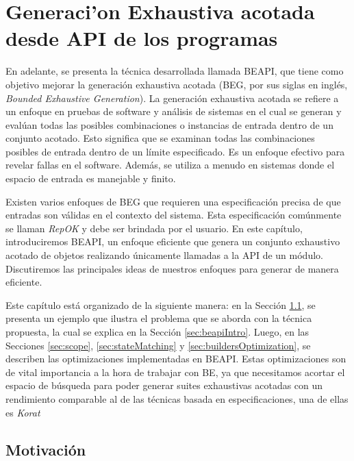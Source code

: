 \chapter{Generaci'on Exhaustiva acotada desde API de los programas}
\label{cap:beapi}

En adelante, se presenta la técnica desarrollada llamada BEAPI, que tiene como objetivo mejorar la generación exhaustiva acotada (BEG, por sus siglas en inglés, \emph{Bounded Exhaustive Generation}). 
La generación exhaustiva acotada se refiere a un enfoque en pruebas de software
y análisis de sistemas en el cual se generan y evalúan todas las posibles combinaciones o instancias de entrada dentro de un conjunto acotado. 
Esto significa que se examinan todas las combinaciones posibles de entrada dentro de un límite especificado. 
Es un enfoque efectivo para revelar fallas en el software. Además, se utiliza a menudo en sistemas donde el espacio de entrada es manejable y finito. 

Existen varios enfoques de BEG que requieren una especificación precisa de que entradas son válidas en el contexto del sistema. 
Esta especificación comúnmente se llaman \emph{RepOK} y debe ser brindada por el usuario.
En este capítulo, introduciremos BEAPI, un enfoque eficiente que genera un conjunto exhaustivo acotado de objetos realizando únicamente llamadas a la API de un módulo. 
Discutiremos las principales ideas de nuestros enfoques para generar de manera eficiente. 

Este capítulo está organizado de la siguiente manera: en la Sección \ref{sec:motivating-example}, 
se presenta un ejemplo que ilustra el problema que se aborda con la técnica propuesta, 
la cual se explica en la Sección \ref{sec:beapiIntro}. Luego, en las Secciones \ref{sec:scope}, \ref{sec:stateMatching} y
 \ref{sec:buildersOptimization}, se describen las optimizaciones implementadas en BEAPI. 
 Estas optimizaciones son de vital importancia a la hora de trabajar con BE, 
 ya que necesitamos acortar el espacio de búsqueda para poder generar suites exhaustivas acotadas con un 
 rendimiento comparable al de las técnicas basada en especificaciones, una de ellas es \emph{Korat}\cite{Boyapati02} 


\section[Motivación]{Motivación}
\label{sec:motivating-example}


